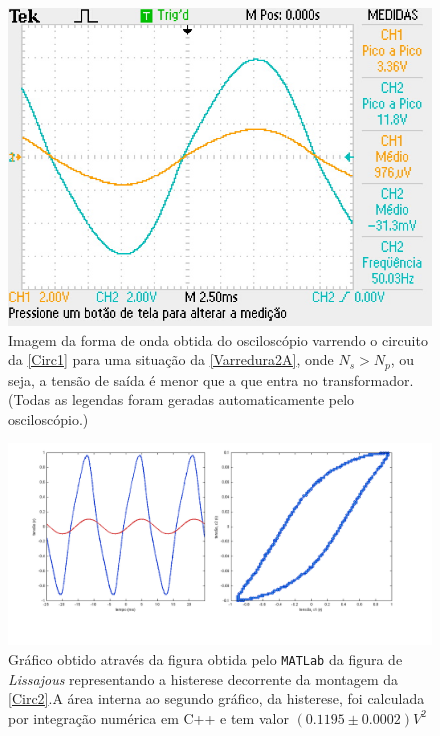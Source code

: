 \documentclass[11pt,a4paper]{article}
\begin{document}
    \newpage
    \begin{figure}[!htb]
    \centering
    \includegraphics[scale=1]{FiguraA.JPG}
    \caption{Imagem da forma de onda obtida do osciloscópio varrendo o circuito da \cref{Circ1} para uma situação da \cref{Varredura2A}, onde $N_s > N_p$, ou seja, a tensão de saída é menor que a que entra no transformador. (Todas as legendas foram geradas automaticamente pelo osciloscópio.)}
    \label{FiguraB}
    \end{figure}
    
    \begin{figure}[!htb]
    \centering
    \includegraphics[scale=0.55]{Varredura3.png}
    \caption{Gráfico obtido através da figura obtida pelo \texttt{MATLab} da figura de \textit{Lissajous} representando a histerese decorrente da montagem da \cref{Circ2}.\newline A área interna ao segundo gráfico, da histerese, foi calculada por integração numérica em C++ e tem valor $(0.1195 \pm 0.0002)V^2$}
    \label{Varredura3}
    \end{figure}
%
%
\newpage
\end{document}
